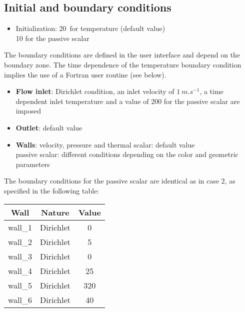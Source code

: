         \subsection{Initial and boundary conditions}

\begin{itemize}
\renewcommand{\labelitemi}{$\rightarrow$}
        \item Initialization: 20\degresC\ for temperature (default value) \\
        \hspace*{2.1cm}        10 for the passive scalar
\end{itemize}

The boundary conditions are defined in the user interface and depend on the
boundary zone. The time dependence of the temperature boundary condition implies
the use of a Fortran user routine (see below).

\begin{itemize}
        \item {\bfseries Flow inlet}: Dirichlet condition, an inlet velocity of
$1\ m.s^{-1}$, a time dependent inlet temperature and a value of 200 for the
passive scalar are imposed
        \item {\bfseries Outlet}: default value
        \item {\bfseries Walls}: velocity, pressure and thermal scalar: default value \\
                    \hspace*{1.25cm} passive scalar: different conditions
depending on the color and geometric parameters
\end{itemize}

The boundary conditions for the passive scalar are identical as in case 2,
as specified in the following table:

\begin{center}
\begin{tabular}{|c|c|c|}
\hline
Wall & Nature & Value \\
\hline
wall\_1 & Dirichlet  & 0 \\
\hline
wall\_2 & Dirichlet  & 5 \\
\hline
wall\_3 & Dirichlet  & 0 \\
\hline
wall\_4 & Dirichlet  & 25 \\
\hline
wall\_5 & Dirichlet  & 320 \\
\hline
wall\_6 & Dirichlet  & 40 \\
\hline
\end{tabular}
\end{center}


